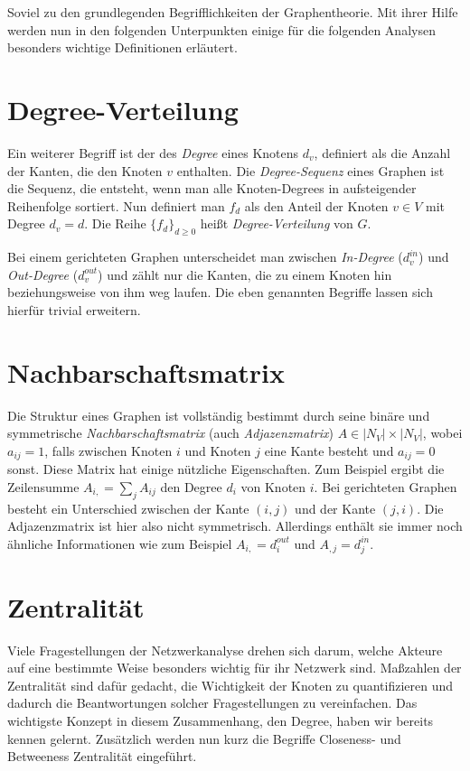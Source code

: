 \documentclass[a4paper,ngerman,oneside,titlepage,bibliography=totoc,11pt]{scrreprt}
\begin{document}
Soviel zu den grundlegenden Begrifflichkeiten der Graphentheorie. Mit ihrer Hilfe werden nun in den folgenden Unterpunkten einige für die folgenden Analysen besonders wichtige Definitionen erläutert.

\section{Degree-Verteilung}
Ein weiterer Begriff ist der des \emph{Degree} eines Knotens $d_v$, definiert als die Anzahl der Kanten, die den Knoten $v$ enthalten. Die \emph{Degree-Sequenz} eines Graphen ist die Sequenz, die entsteht, wenn man alle Knoten-Degrees in aufsteigender Reihenfolge sortiert. Nun definiert man $f_d$ als den Anteil der Knoten $v \in V$ mit Degree $d_v = d$. Die Reihe $\{f_d\}_{d \geq 0}$ heißt \emph{Degree-Verteilung} von $G$. 

Bei einem gerichteten Graphen unterscheidet man zwischen \emph{In-Degree} ($d_v^{in}$) und \emph{Out-Degree} ($d_v^{out}$) und zählt nur die Kanten, die zu einem Knoten hin beziehungsweise von ihm weg laufen. Die eben genannten Begriffe lassen sich hierfür trivial erweitern.

\section{Nachbarschaftsmatrix}

Die Struktur eines Graphen ist vollständig bestimmt durch seine binäre und symmetrische\emph{ Nachbarschaftsmatrix} (auch \emph{Adjazenzmatrix}) $A \in |N_V| \times |N_V|$, wobei $a_{ij} = 1$, falls zwischen Knoten $i$ und Knoten $j$ eine Kante besteht und $a_{ij} = 0$ sonst. Diese Matrix hat einige nützliche Eigenschaften. Zum Beispiel ergibt die Zeilensumme $A_{i,} = \sum_j{A_{ij}}$ den Degree $d_i$ von Knoten $i$.  
Bei gerichteten Graphen besteht ein Unterschied zwischen der Kante $(i,j)$ und der Kante $(j,i)$. Die Adjazenzmatrix ist hier also nicht symmetrisch. Allerdings enthält sie immer noch ähnliche Informationen wie zum Beispiel $A_{i,} = d_i^{out}$ und $A_{,j} = d_j^{in}$.

\section{Zentralität}
Viele Fragestellungen der Netzwerkanalyse drehen sich darum, welche Akteure auf eine bestimmte Weise besonders wichtig für ihr Netzwerk sind. Maßzahlen der Zentralität sind dafür gedacht, die Wichtigkeit der Knoten zu quantifizieren und dadurch die Beantwortungen solcher Fragestellungen zu vereinfachen. Das wichtigste Konzept in diesem Zusammenhang, den Degree, haben wir bereits kennen gelernt. Zusätzlich werden nun kurz die Begriffe Closeness- und Betweeness Zentralität eingeführt.
\end{document}
